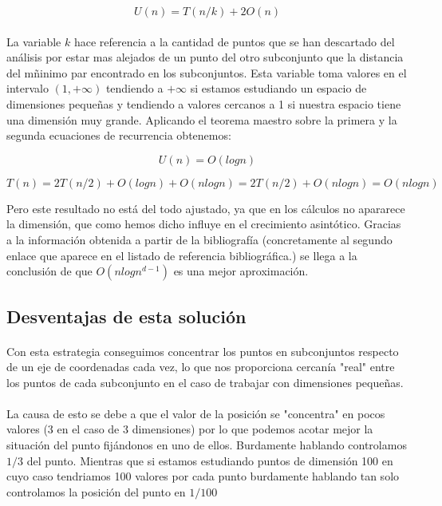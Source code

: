 \documentclass{article}
\begin{document}
		\begin{equation}
		U(n) = T(n/k) + 2O(n)
		\end{equation}

		\paragraph{}
		La variable $k$ hace referencia a la cantidad de puntos que se han descartado del análisis por estar mas alejados de un punto del otro subconjunto que la distancia del mñinimo par encontrado en los subconjuntos. Esta variable toma valores en el intervalo $(1, +\infty)$ tendiendo a $+\infty$ si estamos estudiando un espacio de dimensiones pequeñas y tendiendo a valores cercanos a 1 si nuestra espacio tiene una dimensión muy grande. Aplicando el teorema maestro sobre la primera y la segunda ecuaciones de recurrencia obtenemos:
		
		\begin{equation}
			U(n) = O(logn)
		\end{equation}
		
		\begin{equation}
			T(n) = 2T(n/2) +  O(logn) + O(nlogn) = 2T(n/2) + O(nlogn) = O(nlogn)
		\end{equation}
		
		Pero este resultado no está del todo ajustado, ya que en los cálculos no apararece la dimensión, que como hemos dicho influye en el crecimiento asintótico. Gracias a la información obtenida a partir de la bibliografía (concretamente al segundo enlace que aparece en el listado de referencia bibliográfica.) se llega a la conclusión de que $O(nlogn^{d-1})$ es una mejor aproximación.
		
	\subsection{Desventajas de esta solución}
	

		\paragraph{}
		Con esta estrategia conseguimos concentrar los puntos en subconjuntos respecto de un eje de coordenadas cada vez, lo que nos proporciona cercanía "real" entre los puntos de cada subconjunto en el caso de trabajar con dimensiones pequeñas.
		
		\paragraph{}
		La causa de esto se debe a que el valor de la posición se "concentra" en pocos valores (3 en el caso de 3 dimensiones) por lo que podemos acotar mejor la situación del punto fijándonos en uno de ellos. Burdamente hablando controlamos $1/3$ del punto. Mientras que si estamos estudiando puntos de dimensión 100 en cuyo caso tendriamos 100 valores por cada punto burdamente hablando tan solo controlamos la posición del punto en $1/100$
		
\end{document}
